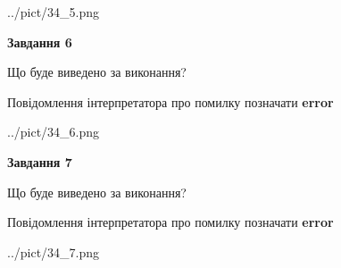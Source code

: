 \documentclass[10pt, ukrainian]{article}
\begin{document}
{\begin {large}
\begin{center}
	{../pict/34_5.png}
\end{center}
\newpage

{\begin {center}\textbf{Завдання 6}\end {center}}\par
Що буде виведено за виконання? \par
Повідомлення інтерпретатора про помилку позначати \textbf{error}

\begin{center}
	{../pict/34_6.png}
\end{center}
\newpage

{\begin {center}\textbf{Завдання 7}\end {center}}\par
Що буде виведено за виконання? \par
Повідомлення інтерпретатора про помилку позначати \textbf{error}

\begin{center}
	{../pict/34_7.png}
\end{center}
\newpage

\end {large}}
\end{document}
